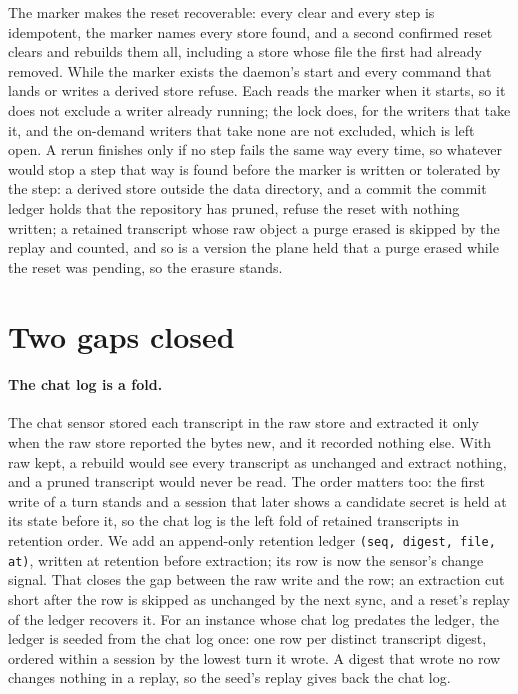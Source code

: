 \documentclass[11pt]{article}
\theoremstyle{plain}
\theoremstyle{definition}
\theoremstyle{remark}
\newcommand{\code}[1]{\texttt{#1}}
\begin{document}
The marker makes the reset recoverable: every clear and every step is idempotent, the marker names
every store found, and a second confirmed reset clears and rebuilds them all, including a store
whose file the first had already removed. While the marker exists the daemon's start and every
command that lands or writes a derived store refuse. Each reads the marker when it starts, so it
does not exclude a writer already running; the lock does, for the writers that take it, and the
on-demand writers that take none are not excluded, which is left open. A rerun finishes only if no
step fails the same way every time, so whatever would stop a step that way is found before the
marker is written or tolerated by the step: a derived store outside the data directory, and a
commit the commit ledger holds that the repository has pruned, refuse the reset with nothing
written; a retained transcript whose raw object a purge erased is skipped by the replay and
counted, and so is a version the plane held that a purge erased while the reset was pending, so
the erasure stands.

\section{Two gaps closed}\label{sec:gaps}

\paragraph{The chat log is a fold.} The chat sensor stored each transcript in the raw store and
extracted it only when the raw store reported the bytes new, and it recorded nothing else. With
raw kept, a rebuild would see every transcript as unchanged and extract nothing, and a pruned
transcript would never be read. The order matters too: the first write of a turn stands and a
session that later shows a candidate secret is held at its state before it, so the chat log is the
left fold of retained transcripts in retention order. We add an append-only retention ledger
\code{(seq, digest, file, at)}, written at retention before extraction; its row is now the sensor's
change signal. That closes the gap between the raw write and the row; an extraction cut short after
the row is skipped as unchanged by the next sync, and a reset's replay of the ledger recovers it.
For an instance
whose chat log predates the ledger, the ledger is seeded from the chat log once: one row per
distinct transcript digest, ordered within a session by the lowest turn it wrote. A digest that
wrote no row changes nothing in a replay, so the seed's replay gives back the chat log.
\end{document}
